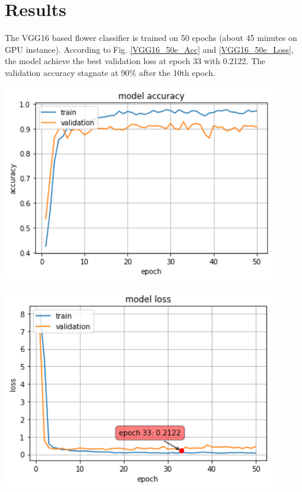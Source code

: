 \newpage
\section{Results}

The VGG16 based flower classifier is trained on 50 epochs (about 45 minutes on GPU instance). According to Fig. \ref{VGG16_50e_Acc} and \ref{VGG16_50e_Loss}, the model achieve the best validation loss at epoch 33 with 0.2122. The validation accuracy stagnate at 90\% after the 10th epoch.

\begin{center}
	\centering
	\begin{minipage}{0.5\textwidth}
		\centering
		\includegraphics[width=0.9\textwidth]{./sections/04_results/output_33_0.png}
		\label{VGG16_50e_Acc}
	\end{minipage}\hfill
	\begin{minipage}{0.5\textwidth}
		\centering
		\includegraphics[width=0.9\textwidth]{./sections/04_results/output_33_1.png} 
		\label{VGG16_50e_Loss}
	\end{minipage}
\end{center}

